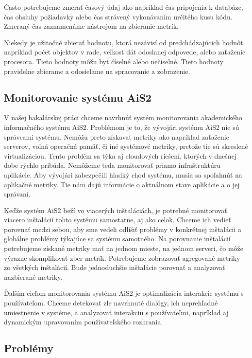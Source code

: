 \documentclass[a4paper, usesections, upjsfrontpage, thesismargins, thesislinespacing]{rnthesis}
\begin{document}
Často potrebujeme zmerať časový údaj ako napríklad čas pripojenia k databáze, čas obsluhy požiadavky alebo čas strávený vykonávaním určitého kusu kódu. Zmeraný čas zaznamenáme nástrojom na zbieranie metrík.

Niekedy je užitočné zbierať hodnotu, ktorá nezávisí od predchádzajúcich hodnôt napríklad počet objektov v rade, veľkosť dát odoslanej odpovede, alebo zaťaženie procesora. 
Tieto hodnoty môžu byť číselné alebo nečíselné. Tieto hodnoty pravidelne zbierame a odosielame na spracovanie a zobrazenie.

\subsection{Monitorovanie systému AiS2}

V našej bakalárskej práci chceme navrhnúť systém monitorovania akademického informačného systému AiS2.
Problémom je to, že vývojári systému AiS2 nie sú správcami systému.
Nemôžu preto získavať metriky ako napríklad zaťaženie serverov, voľná operačná pamäť, či iné systémové metriky, pretože tie sú skreslené virtualizáciou.
Tento problém sa týka aj cloudových riešení, ktorých v dnešnej dobe rýchlo pribúda.
Nemôžeme teda monitorovať priamo infraštruktúru aplikácie.
Aby vývojári zabezpečili hladký chod systému, musia sa spoľahnúť na aplikačné metriky.
Tie nám dajú informácie o aktuálnom stave aplikácie a o jej správaní.

Keďže systém AiS2 beží vo viacerých inštaláciách, 
	je potrebné monitorovať viacero inštalácií tohto systému samostatne, aj ako celok.
Chceme ich vedieť porovnať medzi sebou, 
	aby sme vedeli odlíšiť problémy v konkrétnej inštalácii a globálne problémy týkajúce sa systému samotného.
Na porovnanie inštalácií potrebujeme získané metriky mať na jednom mieste, na jednom serveri, čo môže výrazne skomplikovať zber metrík.
Potrebujeme zobrazovať agregované metriky zo všetkých inštalácií.
Bude jednoduchšie inštalácie porovnať a analyzovať nazbierané metriky.

Ďalším cieľom monitorovania systému AiS2 je optimalizácia interakcie systému s používateľom.
Chceme detekovať zle navrhnuté dialógy, ich neprehľadné umiestnenie v systéme, a analyzovať interakciu s používateľmi, napríklad aj dynamickým upravovaním používateľského rozhrania.

\subsection{Problémy}
\end{document}
